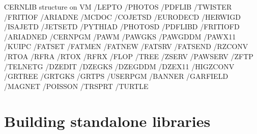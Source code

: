 \begin{XMPt}{CERNLIB structure on VM}
                                /LEPTO
                                /PHOTOS
                                /PDFLIB
                                /TWISTER
                                /FRITIOF
                                /ARIADNE
                                /MCDOC
                                      /COJETSD
                                      /EURODECD
                                      /HERWIGD
                                      /ISAJETD
                                      /JETSETD
                                      /PYTHIAD
                                      /PHOTOSD
                                      /PDFLIBD
                                      /FRITIOFD
                                      /ARIADNED
                         /CERNPGM
                                 /PAWM
                                      /PAWGKS
                                      /PAWGDDM
                                      /PAWX11
                                 /KUIPC
                                 /FATSET
                                        /FATMEN
                                        /FATNEW
                                        /FATSRV
                                        /FATSEND
                                 /RZCONV
                                        /RTOA
                                        /RFRA
                                        /RTOX
                                        /RFRX
                                 /FLOP
                                 /TREE
                                 /ZSERV
                                 /PAWSERV
                                 /ZFTP
                                 /TELNETG
                                 /DZEDIT
                                        /DZEGKS
                                        /DZEGDDM
                                        /DZEX11
                                 /HIGZCONV
                                 /GRTREE
                                        /GRTGKS
                                        /GRTPS
                         /USERPGM
                                 /BANNER
                                 /GARFIELD
                                 /MAGNET
                                 /POISSON
                                 /TRSPRT
                                 /TURTLE
 
\end{XMPt}

\section{Building standalone libraries}

